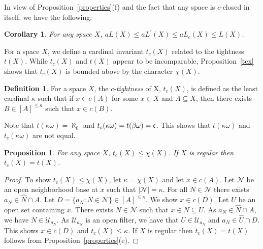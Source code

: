 \documentclass[11pt]{amsart}
\newif\ifdraft\draftfalse
\newtheorem{corollary}[theorem]{Corollary}
\newtheorem{proposition}[theorem]{Proposition}
\theoremstyle{definition}
\newtheorem{definition}[theorem]{Definition}
\theoremstyle{remark}
\numberwithin{equation}{section}
\begin{document}
In view of Proposition~\ref{properties}(f) and the fact that any space is $c$-closed in itself, we have the following:

\begin{corollary}{{\immediate{}}{\ifdraft\hspace{-\lastskip}\vadjust{\vspace{-1mm}\smash{\llap{{\tt {{anotherProp}}}\hspace{8mm}}}\vspace{1mm}}\fi}} 
For any space $X$, $aL(X)\leq aL^\prime(X)\leq aL_c(X)\leq L(X)$.
\end{corollary}

For a space $X$, we define a cardinal invariant $t_c(X)$ related to the tightness $t(X)$. While $t_c(X)$ and $t(X)$ appear to be incomparable, Proposition~\ref{tcx} shows that $t_c(X)$ is bounded above by the character $\chi(X)$. 

\begin{definition}
For a space $X$, the $c$-\emph{tightness} of X, $t_c(X)$, is defined as the least cardinal $\kappa$ such that if $x\in c(A)$ for some $x\in X$ and $A{\subseteq} X$, then there exists $B\in[A]^{\leq\kappa}$ such that $x\in c(B)$.
\end{definition}

Note that $t(\kappa\omega) = \aleph_0$ and $t_c(\kappa\omega) = t(\beta\omega) = \frak{c}$. This shows that $t(\kappa\omega) $ and $t_c(\kappa\omega)$ are not equal.

\begin{proposition}{{\immediate{}}{\ifdraft\hspace{-\lastskip}\vadjust{\vspace{-1mm}\smash{\llap{{\tt {{tcx}}}\hspace{8mm}}}\vspace{1mm}}\fi}}
For any space $X$, $t_c(X)\leq\chi(X)$. If $X$ is regular then $t_c(X)=t(X)$.
\end{proposition}

\begin{proof}
To show $t_c(X)\leq\chi(X)$, let $\kappa=\chi(X)$ and let $x\in c(A)$. Let ${\ensuremath{\mathcal{{N}}}}$ be an open neighborhood base at $x$ such that $|{\ensuremath{\mathcal{{N}}}}|=\kappa$. For all $N\in{\ensuremath{\mathcal{{N}}}}$ there exists $a_N\in\widehat{N}{\cap} A$. Let $D=\{a_N:N\in{\ensuremath{\mathcal{{N}}}}\}\in[A]^{\leq\kappa}$. We show $x\in c(D)$. Let $U$ be an open set containing $x$. There exists $N\in{\ensuremath{\mathcal{{N}}}}$ such that $x\in N{\subseteq} U$. As $a_N\in\widehat{N}{\cap} A$, we have $N\in{\ensuremath{\mathcal{{U}}}}_{a_N}$. As ${\ensuremath{\mathcal{{U}}}}_{a_N}$ is an open filter, we have that $U\in{\ensuremath{\mathcal{{U}}}}_{a_N}$ and $a_N\in\widehat{U}{\cap} D$. This shows $x\in c(D)$ and $t_c(X)\leq\kappa$. If $X$ is regular then $t_c(X)=t(X)$ follows from Proposition~\ref{properties}(e).
\end{proof}
\end{document}
